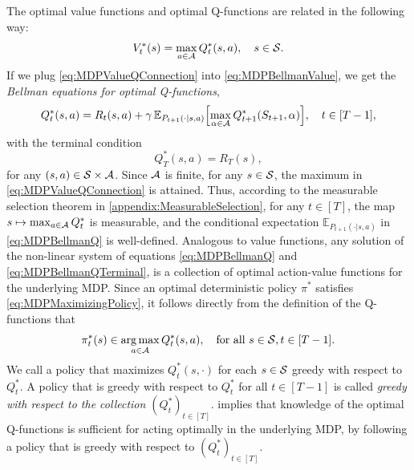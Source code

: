 \documentclass[
    a4paper,
    11pt,
    bibliography=totoc,
    listof=totoc,      
    headinclude=true,
    cleardoublepage=empty,
]{scrbook}
\theoremstyle{plain}
\theoremstyle{definition}
\theoremstyle{remark}
\newcommand{\E}{\mathbb E}
\newcommand{\SpaceS}{{\cal S}}
\newcommand{\SpaceA}{{\cal A}}
\DeclareMathOperator*{\argmax}{arg\,max}
\begin{document}
The optimal value functions and optimal Q-functions are
related in the following way:
\begin{equation}
\label{eq:MDPValueQConnection} 
    V^*_t(s) = \max_{a\in\SpaceA} Q^*_t(s,a), \quad s\in\SpaceS.
\end{equation}
If we plug \eqref{eq:MDPValueQConnection} into \eqref{eq:MDPBellmanValue}, we 
get the \textit{Bellman equations for optimal Q-functions},
\begin{equation}
\label{eq:MDPBellmanQ}
    Q^*_t(s,a) =         
    R_t(s,a) + \gamma\, \E_{P_{t+1}(\cdot|s,a)}\Bigl[
        \max_{\alpha\in\SpaceA} Q^*_{t+1}(S_{t+1},\alpha)
    \Bigr], 
    \quad t\in[T-1],
\end{equation}
with the terminal condition
\begin{equation}
\label{eq:MDPBellmanQTerminal}
	Q^*_T(s,a) = R_T(s),
\end{equation}
for any $(s,a) \in \SpaceS \times \SpaceA$. Since $\SpaceA$ is finite, for any 
$s\in\SpaceS$, the maximum in \eqref{eq:MDPValueQConnection} is attained. 
Thus, according to the measurable selection theorem in 
\cref{appendix:MeasurableSelection}, for any $t\in[T]$, the map $s \mapsto 
\max_{a\in\SpaceA} Q^*_t$ is measurable, and the conditional expectation 
$\E_{P_{t+1}(\cdot|s,a)}$ in \eqref{eq:MDPBellmanQ} is well-defined.
%
Analogous to value functions, any solution of the non-linear system of 
equations \eqref{eq:MDPBellmanQ} and \eqref{eq:MDPBellmanQTerminal}, is a 
collection of optimal action-value functions for the underlying MDP. Since an optimal deterministic policy $\pi^*$ satisfies \eqref{eq:MDPMaximizingPolicy}, it follows directly from the definition of the
Q-functions that 
\begin{equation}
\label{eq:MDPMaximizingPolicyQ}
    \pi^*_t(s) \in \argmax_{a\in\SpaceA} Q^*_t(s,a), 
    \quad \text{for all } s\in\SpaceS, t\in[T-1].
\end{equation}
We call a policy that maximizes $Q^*_t(s,\cdot)$ for each $s\in\SpaceS$ greedy 
with respect to $Q^*_t$. A policy that is greedy with respect to $Q^*_t$ for 
all $t\in[T-1]$ is called \textit{greedy with respect to the collection 
$(Q_t^*)_{t\in[T]}$}.  implies that knowledge of 
the optimal Q-functions is sufficient for acting optimally in the underlying 
MDP, by following a policy that is greedy with respect to $(Q_t^*)_{t\in[T]}$.
\end{document}
